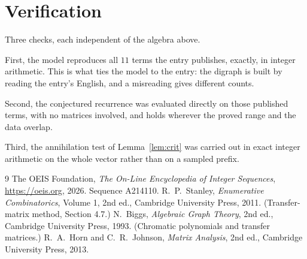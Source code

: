 \documentclass[11pt,a4paper]{article}
\theoremstyle{plain}
\theoremstyle{definition}
\begin{document}
\section{Verification}

Three checks, each independent of the algebra above.

First, the model reproduces all $11$ terms the entry publishes, exactly, in integer
arithmetic. This is what ties the model to the entry: the digraph is built by reading the
entry's English, and a misreading gives different counts.

Second, the conjectured recurrence was evaluated directly on those published terms, with no
matrices involved, and holds wherever the proved range and the data overlap.

Third, the annihilation test of Lemma~\ref{lem:crit} was carried out in exact integer
arithmetic on the whole vector rather than on a sampled prefix.

\begin{thebibliography}{9}
 The OEIS Foundation, \emph{The On-Line Encyclopedia of Integer
Sequences}, \url{https://oeis.org}, 2026. Sequence A214110.
 R.~P.~Stanley, \emph{Enumerative Combinatorics}, Volume 1, 2nd ed.,
Cambridge University Press, 2011. (Transfer-matrix method, Section 4.7.)
 N.~Biggs, \emph{Algebraic Graph Theory}, 2nd ed., Cambridge University
Press, 1993. (Chromatic polynomials and transfer matrices.)
 R.~A.~Horn and C.~R.~Johnson, \emph{Matrix Analysis}, 2nd ed., Cambridge
University Press, 2013.
\end{thebibliography}
\end{document}
